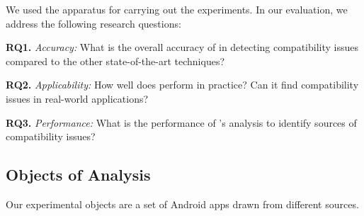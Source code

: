 \begin{figure}[t!]%
        
\end{figure}

We used the \@approach apparatus for carrying out the experiments. In our evaluation, we address the following research questions:


\textbf{RQ1.} \textit{Accuracy:} What is the overall accuracy of \@approach in detecting compatibility issues compared to the other state-of-the-art techniques?

\textbf{RQ2.} \textit{Applicability:} How well does \@approach perform in practice? Can it find compatibility issues in real-world applications?

\textbf{RQ3.} \textit{Performance:} What is the performance of \@approach's analysis to identify sources of compatibility issues?

\subsection{Objects of Analysis}

Our experimental objects are a set of Android apps
drawn from different sources.  

